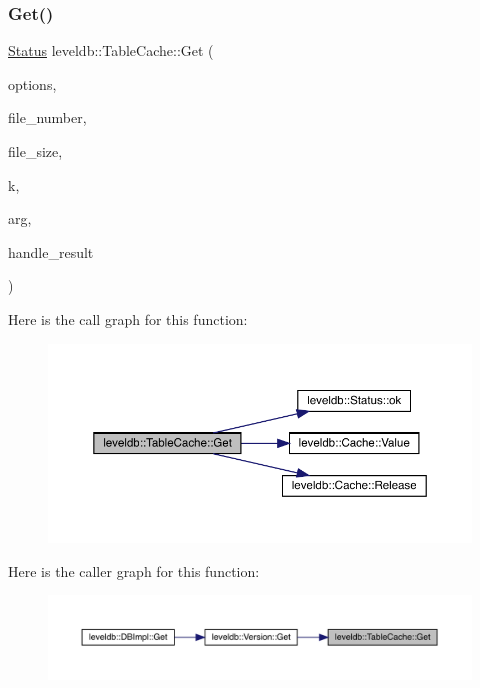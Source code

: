\subsubsection{\texorpdfstring{Get()}{Get()}}
{\footnotesize\ttfamily \mbox{\hyperlink{classleveldb_1_1_status}{Status}} leveldb\+::\+Table\+Cache\+::\+Get (\begin{DoxyParamCaption}\item[{const \mbox{\hyperlink{structleveldb_1_1_read_options}{Read\+Options}} \&}]{options,  }\item[{uint64\+\_\+t}]{file\+\_\+number,  }\item[{uint64\+\_\+t}]{file\+\_\+size,  }\item[{const \mbox{\hyperlink{classleveldb_1_1_slice}{Slice}} \&}]{k,  }\item[{void $\ast$}]{arg,  }\item[{void($\ast$)(void $\ast$, const \mbox{\hyperlink{classleveldb_1_1_slice}{Slice}} \&, const \mbox{\hyperlink{classleveldb_1_1_slice}{Slice}} \&)}]{handle\+\_\+result }\end{DoxyParamCaption})}

Here is the call graph for this function\+:
\nopagebreak
\begin{figure}[H]
\begin{center}
\leavevmode
\includegraphics[width=350pt]{classleveldb_1_1_table_cache_af43ba38b52742e9f5589321747535444_cgraph}
\end{center}
\end{figure}
Here is the caller graph for this function\+:
\nopagebreak
\begin{figure}[H]
\begin{center}
\leavevmode
\includegraphics[width=350pt]{classleveldb_1_1_table_cache_af43ba38b52742e9f5589321747535444_icgraph}
\end{center}
\end{figure}
\mbox{\label{classleveldb_1_1_table_cache_ab3312c170081afb56900b50758765151}} 
